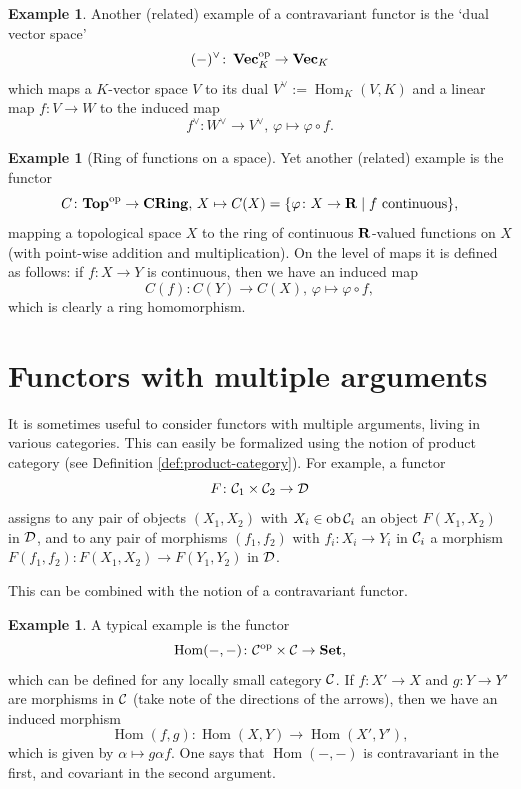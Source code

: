 \documentclass[11pt]{amsbook}
\DeclareMathOperator\Hom{Hom}
\renewcommand{\Vec}{\operatorname{{\bf{Vec}}}}
\DeclareMathOperator\ob{ob}
\def\opp{\mathrm{op}}
\def\Set{\mathbf{Set}}
\def\Top{\mathbf{Top}}
\def\CRing{\mathbf{CRing}}
\theoremstyle{plain}
\theoremstyle{definition}
\newtheorem{example}[theorem]{Example}
\begin{document}
\begin{example}
Another (related) example of a contravariant functor is the `dual vector space'
\[
	(-)^\vee\colon \Vec_K^\opp \to \Vec_K
\]
which maps a $K$-vector space $V$ to its dual $V^{\vee} := \Hom_K(V,K)$ and a linear map
$f\colon V\to W$ to the induced map
\[
	f^\vee\colon W^\vee \to V^\vee,\,
	\varphi \mapsto \varphi\circ f.
\]
\end{example}

\begin{example}[Ring of functions on a space]\label{exa:functions-on-a-space}
Yet another (related) example is the functor
\[
	C\colon \Top^\opp \to \CRing,\, X \mapsto C(X) = \{ \varphi\colon X\to \bR \mid \text{$f$ continuous} \},
\]
mapping a topological space $X$ to the ring of continuous ${\mathbf{R}}$-valued functions on $X$ (with point-wise addition and multiplication). On the level of maps it is defined as follows: if $f\colon X\to Y$ is continuous, then we have an induced map
\[
	C(f) \colon C(Y) \to C(X),\, \varphi \mapsto \varphi\circ f,
\]
which is clearly a ring homomorphism. 
\end{example}

\section{Functors with multiple arguments}


It is sometimes useful to consider functors with multiple arguments, living in various categories. This can easily be formalized using the notion of product category (see Definition \ref{def:product-category}). For example, a functor
\[
	F\colon {\mathcal{C}}_1 \times {\mathcal{C}}_2 \to {\mathcal{D}}
\]
assigns to any pair of objects $(X_1,X_2)$ with $X_i\in \ob \cC_i$ an object $F(X_1,X_2)$ in ${\mathcal{D}}$, and to any pair of morphisms $(f_1,f_2)$ with $f_i\colon X_i\to Y_i$ in ${\mathcal{C}}_i$ a morphism $F(f_1,f_2) \colon F(X_1,X_2) \to F(Y_1,Y_2)$ in ${\mathcal{D}}$. 

This can be combined with the notion of a contravariant functor. 

\begin{example}\label{exa:hom-in-two-arguments}
A typical example is the functor
\[
	\Hom(-,-) \colon \cC^\opp \times \cC \to \Set,
\]
which can be defined for any locally small category ${\mathcal{C}}$. If $f\colon X'\to X$ and $g\colon Y\to Y'$ are morphisms in ${\mathcal{C}}$ (take note of the directions of the arrows), then we have an induced morphism
\[	
	\Hom(f,g)\colon \Hom(X,Y) \to \Hom(X',Y'),
\]
which is given by $\alpha \mapsto g\alpha f$. One says that $\Hom(-,-)$ is contravariant in the first, and covariant in the second argument.
\end{example}
\end{document}
